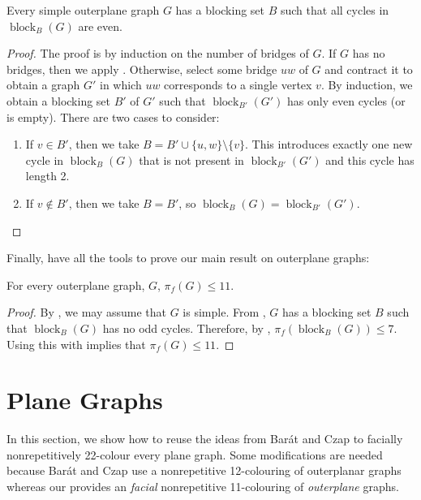 \documentclass{patmorin}
\DeclareMathOperator{\block}{block}
\begin{document}
\begin{lem}
  Every simple outerplane graph $G$ has a blocking set $B$ such that
  all cycles in $\block_B(G)$ are even.
\end{lem}

\begin{proof}
  The proof is by induction on the number of bridges of $G$.  If $G$
  has no bridges, then we apply .  Otherwise,
  select some bridge $uw$ of $G$ and contract it to obtain a graph $G'$
  in which $uw$ corresponds to a single vertex $v$.  By induction,
  we obtain a blocking set $B'$ of $G'$ such that $\block_{B'}(G')$
  has only even cycles (or is empty).  There are two cases to consider:
  \begin{enumerate}
    \item If $v\in B'$, then we take $B=B'\cup\{u,w\}\setminus\{v\}$. This introduces exactly one new cycle in $\block_B(G)$ that is not present in $\block_{B'}(G')$ and this cycle has length 2.

    \item If $v\not\in B'$, then we take $B=B'$, so
    $\block_B(G)=\block_{B'}(G')$. \qedhere
  \end{enumerate}
\end{proof}

Finally, have all the tools to prove our main result on outerplane graphs:

\begin{thm}
  For every outerplane graph, $G$, $\pi_f(G)\le 11$.
\end{thm}

\begin{proof}
By , we may assume that $G$ is simple.  From
, $G$ has a blocking set $B$ such that $\block_B(G)$
has no odd cycles.  Therefore, by , $\pi_f(\block_B(G))\le
7$.  Using this with  implies that $\pi_f(G)\le 11$.
\end{proof}


\section{Plane Graphs}

In this section, we show how to reuse the ideas from Bar\'at and Czap
\cite{barat2013facial} to facially nonrepetitively 22-colour every plane graph.
Some modifications are needed because Bar\'at and Czap use a nonrepetitive
12-colouring of outerplanar graphs whereas our  provides an
\emph{facial} nonrepetitive 11-colouring of \emph{outerplane} graphs.
\end{document}
